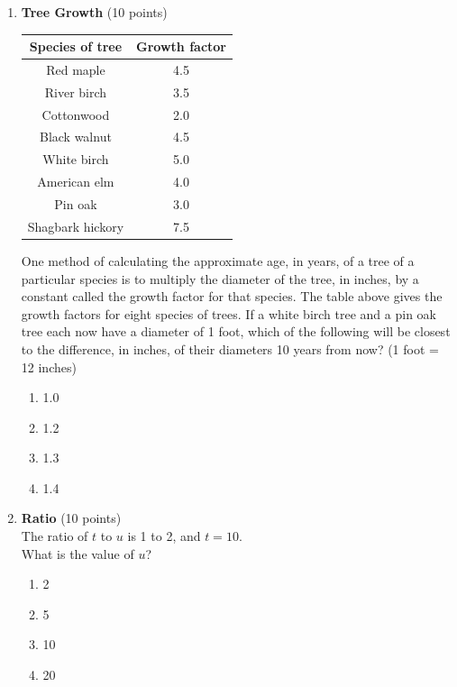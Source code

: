 \begin{enumerate}
  \item \textbf{Tree Growth} (10 points)\\
  \begin{center}
  \begin{tabular}{|c|c|}
  \hline
  Species of tree & Growth factor \\
  \hline
  Red maple & 4.5 \\
  \hline
  River birch & 3.5 \\
  \hline
  Cottonwood & 2.0 \\
  \hline
  Black walnut & 4.5 \\
  \hline
  White birch & 5.0 \\
  \hline
  American elm & 4.0 \\
  \hline
  Pin oak & 3.0 \\
  \hline
  Shagbark hickory & 7.5 \\
  \hline
  \end{tabular}
  \end{center}

  One method of calculating the approximate age, in years, of a tree of a particular species is to multiply the diameter of the tree, in inches, by a constant called the growth factor for that species. The table above gives the growth factors for eight species of trees. If a white birch tree and a pin oak tree each now have a diameter of 1 foot, which of the following will be closest to the difference, in inches, of their diameters 10 years from now? (1 foot = 12 inches)
  \begin{enumerate}[label=(\Alph*)]
    \item 1.0
    \item 1.2
    \item 1.3
    \item 1.4
  \end{enumerate}
  \begin{subanswer}
  \end{subanswer}

  \item \textbf{Ratio} (10 points)\\
  The ratio of $t$ to $u$ is 1 to 2, and $t=10$.\\
  What is the value of $u$?
  \begin{enumerate}[label=(\Alph*)]
    \item 2
    \item 5
    \item 10
    \item 20
  \end{enumerate}
  \begin{subanswer}
  \end{subanswer}


\end{enumerate}
